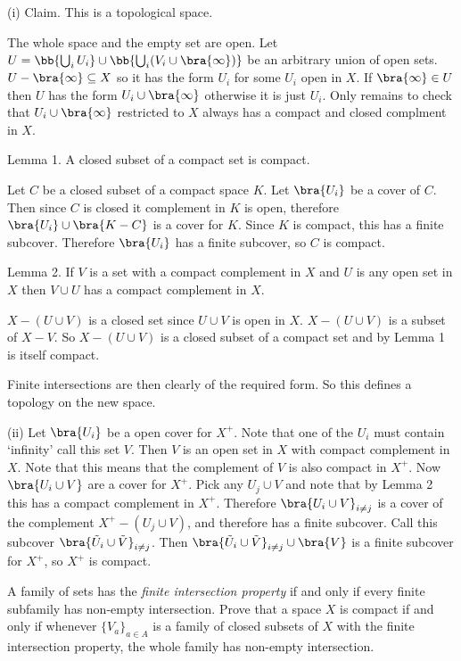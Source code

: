 \begin{solution}[\bf Solution.]
\ben
\item [(i)] Claim. This is a topological space.

The whole space and the empty set are open. Let $U = \bb{\bigcup_i U_i} \cup \bb{\bigcup_i (V_i\cup \bra{\infty})}$ be an arbitrary union of open sets. $U - \bra{\infty} \subseteq X$ so it has the form $U_i$ for some $U_i$ open in $X$. If $\bra{\infty} \in U$ then $U$ has the form $U_i \cup \bra{\infty}$ otherwise it is just $U_i$. Only remains to check that $U_i \cup \bra{\infty}$ restricted to $X$ always has a compact and closed complment in $X$.

Lemma 1. A closed subset of a compact set is compact.

Let $C$ be a closed subset of a compact space $K$. Let $\bra{U_i}$ be a cover of $C$. Then since $C$ is closed it complement in $K$ is open, therefore $\bra{U_i} \cup \bra{K-C}$ is a cover for $K$. Since $K$ is compact, this has a finite subcover. Therefore $\bra{U_i}$ has a finite subcover, so $C$ is compact.

Lemma 2. If $V$ is a set with a compact complement in $X$ and $U$ is any open set in $X$ then $V\cup U$ has a compact complement in $X$.

$X -(U\cup V)$ is a closed set since $U\cup V$ is open in $X$. $X-(U\cup V)$ is a subset of $X-V$. So $X-(U\cup V)$ is a closed subset of a compact set and by Lemma 1 is itself compact.

Finite intersections are then clearly of the required form. So this defines a topology on the new space.

\item [(ii)] Let $\bra{U_i}$ be a open cover for $X^+$. Note that one of the $U_i$ must contain `infinity' call this set $V$. Then $V$ is an open set in $X$ with compact complement in $X$. Note that this means that the complement of $V$ is also compact in $X^+$. Now $\bra{U_i \cup V}$ are a cover for $X^+$. Pick any $U_j \cup V$ and note that by Lemma 2 this has a compact complement in $X^+$. Therefore $\bra{U_i \cup V}_{i\neq j}$ is a cover of the complement $X^+ - (U_j \cup V)$, and therefore has a finite subcover. Call this subcover $\bra{\tilde{U}_i \cup \tilde{V}}_{i\neq j}$. Then $\bra{\tilde{U}_i \cup \tilde{V}}_{i\neq j} \cup \bra{V}$ is a finite subcover for $X^+$, so $X^+$ is compact.
\een
\end{solution}


\begin{problem}
A family of sets has the \emph{finite intersection property} if and only if every finite subfamily has non-empty intersection. Prove that a space $X$ is compact if and only if whenever $\{V_a\}_{a\in A}$ is a family of closed subsets of $X$ with the finite intersection property, the whole family has non-empty intersection.
\end{problem}


